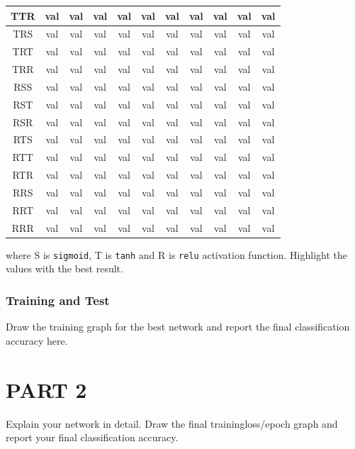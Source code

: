 \documentclass{article}
\begin{document}
\begin{table}[H]
{\begin{tabular}{|c|c|c|c|c|c|c|c|c|c|c|}
        \hline
        TTR & val & val & val & val & val & val & val & val & val & val \\
        \hline
        TRS & val & val & val & val & val & val & val & val & val & val \\
        \hline
        TRT & val & val & val & val & val & val & val & val & val & val \\
        \hline
        TRR & val & val & val & val & val & val & val & val & val & val \\
        \hline
        RSS & val & val & val & val & val & val & val & val & val & val \\
        \hline
        RST & val & val & val & val & val & val & val & val & val & val \\
        \hline
        RSR & val & val & val & val & val & val & val & val & val & val \\
        \hline
        RTS & val & val & val & val & val & val & val & val & val & val \\
        \hline
        RTT & val & val & val & val & val & val & val & val & val & val \\
        \hline
        RTR & val & val & val & val & val & val & val & val & val & val \\
        \hline
        RRS & val & val & val & val & val & val & val & val & val & val \\
        \hline
        RRT & val & val & val & val & val & val & val & val & val & val \\
        \hline
        RRR & val & val & val & val & val & val & val & val & val & val \\
        \hline
        
\end{tabular}%
}
\end{table}

where S is \verb|sigmoid|, T is \verb|tanh| and R is \verb|relu| activation function. Highlight the values with the best result.
\subsubsection{Training and Test}
Draw the training graph for the best network and report the final classification accuracy here.
\section{PART 2}
Explain your network in detail. Draw the final trainingloss/epoch graph and report your final classification accuracy.
\end{document}
